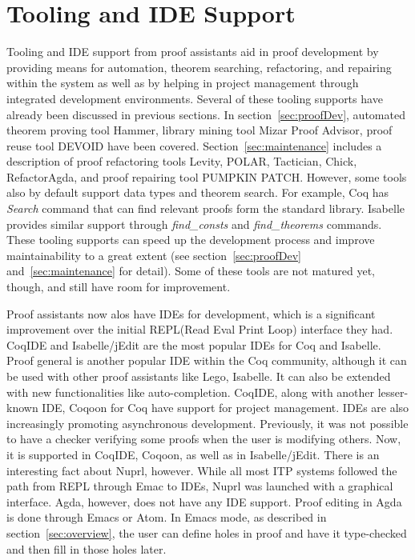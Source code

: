 \section{Tooling and IDE Support}
\label{sec:tooling}

Tooling and IDE support from proof assistants aid in proof development by providing means for automation, theorem searching, refactoring, and repairing within the system as well as by helping in project management through integrated development environments. Several of these tooling supports have already been discussed in previous sections. In section~\ref{sec:proofDev}, automated theorem proving tool Hammer, library mining tool Mizar Proof Advisor, proof reuse tool DEVOID have been covered. Section~\ref{sec:maintenance} includes a description of proof refactoring tools Levity, POLAR, Tactician, Chick, RefactorAgda, and proof repairing tool PUMPKIN PATCH. However, some tools also by default support data types and theorem search. For example, Coq has \emph{Search} command that can find relevant proofs form the standard library. Isabelle provides similar support through \emph{find\_consts} and \emph{find\_theorems} commands. These tooling supports can speed up the development process and improve maintainability to a great extent (see section~\ref{sec:proofDev} and~\ref{sec:maintenance} for detail). Some of these tools are not matured yet, though, and still have room for improvement. 

Proof assistants now alos have IDEs for development, which is a significant improvement over the initial REPL(Read Eval Print Loop) interface they had. CoqIDE and Isabelle/jEdit are the most popular IDEs for Coq and Isabelle. Proof general is another popular IDE within the Coq community, although it can be used with other proof assistants like Lego, Isabelle. It can also be extended with new functionalities like auto-completion. CoqIDE, along with another lesser-known IDE, Coqoon for Coq have support for project management. IDEs are also increasingly promoting asynchronous development. Previously, it was not possible to have a checker verifying some proofs when the user is modifying others. Now, it is supported in CoqIDE, Coqoon, as well as in Isabelle/jEdit. There is an interesting fact about Nuprl, however. While all most ITP systems followed the path from REPL through Emac to IDEs, Nuprl was launched with a graphical interface. Agda, however, does not have any IDE support. Proof editing in Agda is done through Emacs or Atom. In Emacs mode, as described in section~\ref{sec:overview}, the user can define holes in proof and have it type-checked and then fill in those holes later. 

